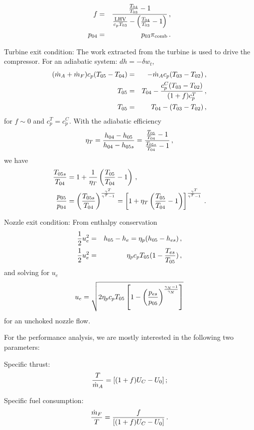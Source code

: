 \begin{itemizePacked}
\begin{eqnarray}
  f &=& {\frac{{\frac{T_{04}}{T_{03}}}-1}{{\frac{\text{LHV}}{c_p T_{03}}}-\left( {\frac{T_{04}}{T_{03}}}-1 \right)}}\,,\\
  p_{04} &=& p_{03} \pi_\text{comb}\,.
\end{eqnarray}
\item Turbine exit condition:
The work extracted from the turbine is used to drive the compressor. For an adiabatic system: $dh = - \delta w_t$,
\begin{eqnarray}
(\dot{m}_A+\dot{m}_F)c_p (T_{05}-T_{04}) &=& -\dot{m}_A c_p (T_{03}-T_{02})\,,\\
T_{05} &=& T_{04} - {\frac{c_p^C (T_{03}-T_{02})}{(1+f) c_p^T}}\,,\\
T_{05} &=& T_{04} - (T_{03}-T_{02})\,,
\end{eqnarray}
for $f \sim 0$ and $c_p^T = c_p^C$.
With the adiabatic efficiency
\begin{equation}
\eta_T = {\frac{h_{04}-h_{05}}{h_{04}-h_{05s}}} = {\frac{{\frac{T_{05}}{T_{04}}}-1}{{\frac{T_{05s}}{T_{04}}}-1}}\,,
\end{equation}
we have
\begin{align}
{\frac{T_{05s}}{T_{04}}} &= 1+{\frac{1}{\eta_T}} \left( \frac{T_{05}}{T_{04}}-1 \right)\,,\\
{\frac{p_{05}}{p_{04}}} &= \left({\frac{T_{05s}}{T_{04}}}\right)^{\frac{\gamma^T}{\gamma^T-1}} = \left[ 1+\eta_T \left( {\frac{T_{05}}{T_{04}}}-1 \right) \right]^{\frac{\gamma^T}{\gamma^T-1}}\,. \label{eq:p05_over_p04}
\end{align}
\item Nozzle exit condition: From enthalpy conservation
\begin{eqnarray}
{\frac{1}{2}}u_e^2 &=& h_{05} - h_e = \eta_p(h_{05}-h_{es})\,,\\
{\frac{1}{2}}u_e^2 &=& \eta_p c_p T_{05}(1-{\frac{T_{es}}{T_{05}}})\,,
\end{eqnarray}
and solving for $u_e$
\begin{equation}
u_e = \sqrt{2 \eta_p c_p T_{05}\left[1- \left({\frac{p_{es}}{p_{05}}}\right)^{\frac{\gamma_N-1}{\gamma_N}} \right]}
\end{equation}
for an unchoked nozzle flow.
\end{itemizePacked}

For the performance analysis, we are mostly interested in the following two parameters:
\begin{itemizePacked}
\item Specific thrust:
\begin{equation}
  {\frac{T}{\dot{m}_A}} = [(1+f)U_C - U_0]\,;
\end{equation}
\item Specific fuel consumption:
\begin{equation}
  {\frac{\dot{m}_F}{T}} = {\frac{f}{[(1+f)U_C-U_0]}}\,.
\end{equation}
\end{itemizePacked}


